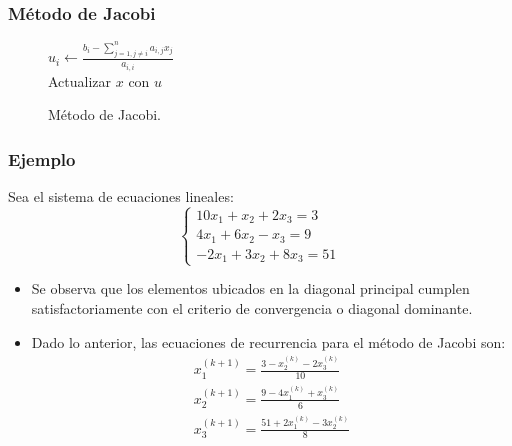 \documentclass[10pt]{beamer}
\begin{document}
  \begin{frame}
  \frametitle{M\'etodo de Jacobi}
  \begin{center}  
  \begin{figure}[h]            
    \begin{algorithm}[H]     
     \caption{M\'etodo de Jacobi.}
     {
      {
        $u_i \leftarrow \displaystyle\frac{b_i-\displaystyle\sum_{j=1,j\neq i}^na_{i,j}x_j}{a_{i,i}}$\\
      }
      Actualizar $x$ con $u$\\
     }    
    \end{algorithm}
    \end{figure}
  \end{center}
  \end{frame}
  \begin{frame}
  \frametitle{Ejemplo}
  Sea el sistema de ecuaciones lineales:
  $$
  \left\{\begin{array}{c}
          10x_1 + x_2 + 2x_3 = 3\\
          4x_1 + 6x_2 - x_3 = 9\\
          -2x_1 + 3x_2 + 8x_3 = 51
         \end{array}
  \right.
  $$
  \begin{itemize}
  \item<2-> Se observa que los elementos ubicados en la diagonal principal cumplen satisfactoriamente con el criterio de convergencia o diagonal dominante.
  \item<3->Dado lo anterior, las ecuaciones de recurrencia para el m\'etodo de Jacobi son:
  $$
  \begin{array}{l}
  x_1^{(k+1)} = \displaystyle\frac{3-x_2^{(k)}-2x_3^{(k)}}{10}\\
  x_2^{(k+1)} = \displaystyle\frac{9-4x_1^{(k)}+x_3^{(k)}}{6}\\
  x_3^{(k+1)} = \displaystyle\frac{51+2x_1^{(k)}-3x_2^{(k)}}{8}
  \end{array}
  $$
  \end{itemize}
  \end{frame}
\end{document}
